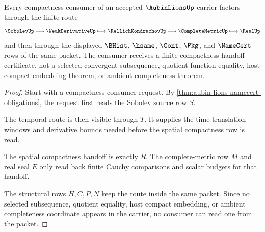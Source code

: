 \begin{theorem}
\label{thm:aubin-lions-compactness-handoff}
Every compactness consumer of an accepted $\AubinLionsUp$ carrier factors through the finite route
$$
\SobolevUp \longmapsto \WeakDerivativeUp \longmapsto \RellichKondrachovUp \longmapsto \CompleteMetricUp \longmapsto \RealUp
$$
and then through the displayed $\BHist$, $\hsame$, $\Cont$, $\Pkg$, and $\NameCert$ rows of the same packet. The consumer receives a finite compactness handoff certificate, not a selected convergent subsequence, quotient function equality, host compact embedding theorem, or ambient completeness theorem.
\end{theorem}
\begin{proof}
Start with a compactness consumer request. By \autoref{thm:aubin-lions-namecert-obligations}, the request first reads the Sobolev source row $S$.

The temporal route is then visible through $T$. It supplies the time-translation windows and derivative bounds needed before the spatial compactness row is read.

The spatial compactness handoff is exactly $R$. The complete-metric row $M$ and real seal $E$ only read back finite Cauchy comparisons and scalar budgets for that handoff.

The structural rows $H,C,P,N$ keep the route inside the same packet. Since no selected subsequence, quotient equality, host compact embedding, or ambient completeness coordinate appears in the carrier, no consumer can read one from the packet.
\end{proof}

